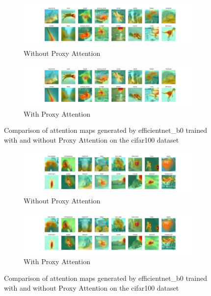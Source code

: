 \begin{figure}[!htb]
    \centering
    \begin{subfigure}[b]{1\textwidth}
        \includegraphics[width=\textwidth]{images/cifar100_efficientnet_b0_noproxy_2.pdf}
        \caption{Without Proxy Attention}
    \end{subfigure}
    \hfill
    \begin{subfigure}[b]{1\textwidth}
        \includegraphics[width=\textwidth]{images/cifar100_efficientnet_b0_proxy_2.pdf}
        \caption{With Proxy Attention}
    \end{subfigure}
    \caption{Comparison of attention maps generated by efficientnet\_b0 trained with and without Proxy Attention on the cifar100 dataset}
\end{figure}


\begin{figure}[!htb]
    \centering
    \begin{subfigure}[b]{1\textwidth}
        \includegraphics[width=\textwidth]{images/cifar100_efficientnet_b0_noproxy_3.pdf}
        \caption{Without Proxy Attention}
    \end{subfigure}
    \hfill
    \begin{subfigure}[b]{1\textwidth}
        \includegraphics[width=\textwidth]{images/cifar100_efficientnet_b0_proxy_3.pdf}
        \caption{With Proxy Attention}
    \end{subfigure}
    \caption{Comparison of attention maps generated by efficientnet\_b0 trained with and without Proxy Attention on the cifar100 dataset}
\end{figure}



